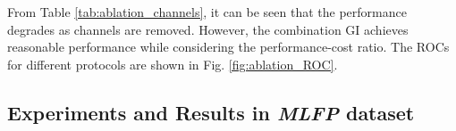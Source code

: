\documentclass[journal]{IEEEtran}
\begin{document}
\begin{table}[h!]

\centering
\caption{ Performance of the proposed framework with different combinations of channels in all protocols of \textit{WMCA} dataset. The values reported are obtained with a threshold computed for BPCER 1\% in  set.}
\label{tab:ablation_channels}

\end{table}


From Table \ref{tab:ablation_channels}, it can be seen that the performance degrades as channels are removed. However, the combination GI achieves reasonable performance while considering the performance-cost ratio. The ROCs for different protocols are shown in Fig. \ref{fig:ablation_ROC}.





\subsection{Experiments and Results in \textit{MLFP} dataset}
\end{document}
